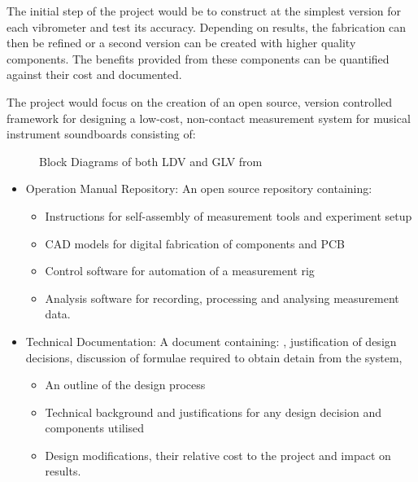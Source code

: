 The initial step of the project would be to construct at the simplest version
for each vibrometer and test its accuracy. Depending on results, the fabrication
can then be refined or a second version can be created with higher quality
components. The benefits provided from these components can be quantified
against their cost and documented.

The project would focus on the creation of an open source, version controlled
framework for designing a low-cost, non-contact measurement system for musical
instrument soundboards consisting of:

\begin{figure}[h]%
  \centering
  \qquad
  \caption{Block Diagrams of both LDV and GLV from \cite{MALAHS2015DESIGNOA}}%
  \label{fig:laser-block}%
\end{figure}

\begin{itemize}
\tightlist
  \item
    Operation Manual Repository: An open source repository containing:
  \begin{itemize}
  \tightlist
    \item
      Instructions for self-assembly of measurement tools and experiment setup 
    \item
      CAD models for digital fabrication of components and PCB
    \item
      Control software for automation of a measurement rig
    \item
      Analysis software for recording, processing and analysing measurement
    data.
  \end{itemize}

\item
  Technical Documentation: A document containing: , justification of design
decisions, discussion of formulae required to obtain detain from the system, 
  \begin{itemize}
  \tightlist
    \item
      An outline of the design process
    \item
      Technical background and justifications for any design decision and
    components utilised
    \item
      Design modifications, their relative cost to the project and impact on
    results. 
  \end{itemize}
\end{itemize}


